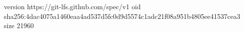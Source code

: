 version https://git-lfs.github.com/spec/v1
oid sha256:4dac4075a1460eaa4ad537d5fc0d9d5574c1adc21f08a951b4805ee41537cea3
size 21960
